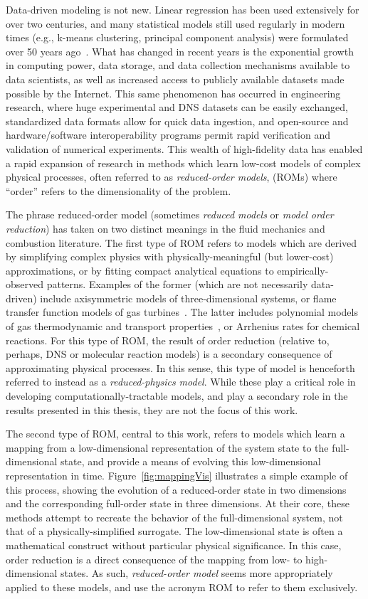 Data-driven modeling is not new. Linear regression has been used extensively for over two centuries, and many statistical models still used regularly in modern times (e.g., k-means clustering, principal component analysis) were formulated over 50 years ago~\cite{dataScience}. What has changed in recent years is the exponential growth in computing power, data storage, and data collection mechanisms available to data scientists, as well as increased access to publicly available datasets made possible by the Internet. This same phenomenon has occurred in engineering research, where huge experimental and DNS datasets can be easily exchanged, standardized data formats allow for quick data ingestion, and open-source and hardware/software interoperability programs permit rapid verification and validation of numerical experiments. This wealth of high-fidelity data has enabled a rapid expansion of research in methods which learn low-cost models of complex physical processes, often referred to as \textit{reduced-order models}, (ROMs) where ``order'' refers to the dimensionality of the problem.

The phrase reduced-order model (sometimes \textit{reduced models} or \textit{model order reduction}) has taken on two distinct meanings in the fluid mechanics and combustion literature. The first type of ROM refers to models which are derived by simplifying complex physics with physically-meaningful (but lower-cost) approximations, or by fitting compact analytical equations to empirically-observed patterns. Examples of the former (which are not necessarily data-driven) include axisymmetric models of three-dimensional systems, or flame transfer function models of gas turbines~\cite{Schuller2002}. The latter includes polynomial models of gas thermodynamic and transport properties~\cite{McBride1993}, or Arrhenius rates for chemical reactions. For this type of ROM, the result of order reduction (relative to, perhaps, DNS or molecular reaction models) is a secondary consequence of approximating physical processes. In this sense, this type of model is henceforth referred to instead as a \textit{reduced-physics model}. While these play a critical role in developing computationally-tractable models, and play a secondary role in the results presented in this thesis, they are not the focus of this work.

The second type of ROM, central to this work, refers to models which learn a mapping from a low-dimensional representation of the system state to the full-dimensional state, and provide a means of evolving this low-dimensional representation in time. Figure~\ref{fig:mappingVis} illustrates a simple example of this process, showing the evolution of a reduced-order state in two dimensions and the corresponding full-order state in three dimensions. At their core, these methods attempt to recreate the behavior of the full-dimensional system, not that of a physically-simplified surrogate. The low-dimensional state is often a mathematical construct without particular physical significance. In this case, order reduction is a direct consequence of the mapping from low- to high-dimensional states. As such, \textit{reduced-order model} seems more appropriately applied to these models, and use the acronym ROM to refer to them exclusively.

